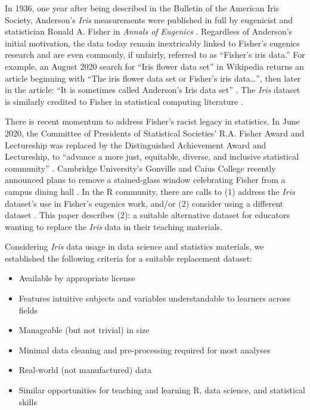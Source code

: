 In 1936, one year after being described in the Bulletin of the American
Iris Society, Anderson's \emph{Iris} measurements were published in full
by eugenicist and statistician Ronald A. Fisher in \emph{Annals of
Eugenics} \citep{fisher_use_1936}. Regardless of Anderson's initial
motivation, the data today remain inextricably linked to Fisher's
eugenics research and are even commonly, if unfairly, referred to as
``Fisher's iris data.'' For example, an August 2020 search for ``Iris
flower data set'' in Wikipedia returns an article beginning with ``The
iris flower data set or Fisher's iris data\ldots{}'', then later in the
article: ``It is sometimes called Anderson's Iris data set''
\citep{wikipedia_iris_2020}. The \emph{Iris} dataset is similarly
credited to Fisher in statistical computing literature
\citep[\citet{wang_matlab_2015}, \citet{woods_how_2015},
\citet{chen_unsupervised_2018}]{trendafilov_simple_2009}.

There is recent momentum to address Fisher's racist legacy in
statistics. In June 2020, the Committee of Presidents of Statistical
Societies' R.A. Fisher Award and Lectureship was replaced by the
Distinguished Achievement Award and Lectureship, to ``advance a more
just, equitable, diverse, and inclusive statistical community''
\citep{noauthor_institute_2020}. Cambridge University's Gonville and
Caius College recently announced plans to remove a stained-glass window
celebrating Fisher from a campus dining hall \citep{noauthor_sir_2020}.
In the R community, there are calls to (1) address the \emph{Iris}
dataset's use in Fisher's eugenics work, and/or (2) consider using a
different dataset
\citep[\citet{garrick_aden-buie_lets_2020}]{poisot_timothee_its_2020}.
This paper describes (2): a suitable alternative dataset for educators
wanting to replace the \emph{Iris} data in their teaching materials.

Considering \emph{Iris} data usage in data science and statistics
materials, we established the following criteria for a suitable
replacement dataset:

\begin{itemize}
\tightlist
\item
  Available by appropriate license
\item
  Features intuitive subjects and variables understandable to learners
  across fields
\item
  Manageable (but not trivial) in size
\item
  Minimal data cleaning and pre-processing required for most analyses
\item
  Real-world (not manufactured) data
\item
  Similar opportunities for teaching and learning R, data science, and
  statistical skills
\end{itemize}

